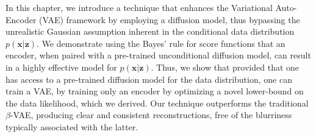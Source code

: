 In this chapter, we introduce a technique that enhances the Variational Auto-Encoder (VAE) framework by employing a diffusion model, thus bypassing the unrealistic Gaussian assumption inherent in the conditional data distribution $p(\textbf{x} | \textbf{z})$. We demonstrate using the Bayes' rule for score functions that an encoder, when paired with a pre-trained unconditional diffusion model, can result in a highly effective model for $p(\textbf{x}| \textbf{z})$. Thus, we show that  provided that one has access to a pre-trained diffusion model for the data distribution, one can train a VAE, by training only an encoder by optimizing a novel lower-bound on the data likelihood, which we derived. Our technique outperforms the traditional $\beta$-VAE, producing clear and consistent reconstructions, free of the blurriness typically associated with the latter.